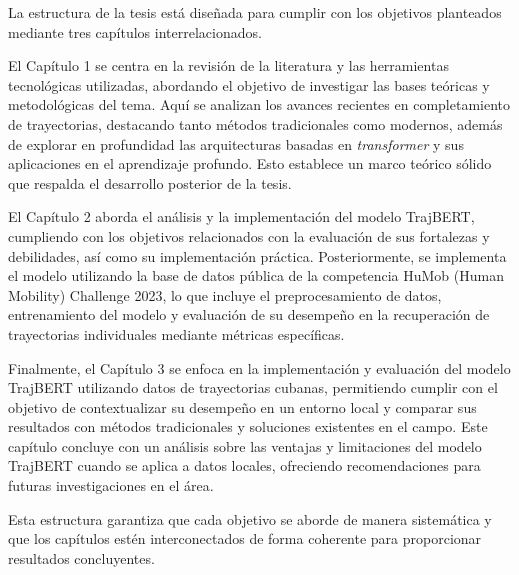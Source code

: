 
La estructura de la tesis está diseñada para cumplir con los objetivos planteados mediante tres capítulos interrelacionados.

El Capítulo 1 se centra en la revisión de la literatura y las herramientas tecnológicas utilizadas, abordando el objetivo de investigar las bases teóricas y metodológicas del tema. Aquí se analizan los avances recientes en completamiento de trayectorias, destacando tanto métodos tradicionales como modernos, además de explorar en profundidad las arquitecturas basadas en \textit{transformer} y sus aplicaciones en el aprendizaje profundo. Esto establece un marco teórico sólido que respalda el desarrollo posterior de la tesis.

El Capítulo 2 aborda el análisis y la implementación del modelo TrajBERT, cumpliendo con los objetivos relacionados con la evaluación de sus fortalezas y debilidades, así como su implementación práctica. Posteriormente, se implementa el modelo utilizando la base de datos pública de la competencia HuMob (Human Mobility) Challenge 2023, lo que incluye el preprocesamiento de datos, entrenamiento del modelo y evaluación de su desempeño en la recuperación de trayectorias individuales mediante métricas específicas.

Finalmente, el Capítulo 3 se enfoca en la implementación y evaluación del modelo TrajBERT utilizando datos de trayectorias cubanas, permitiendo cumplir con el objetivo de contextualizar su desempeño en un entorno local y comparar sus resultados con métodos tradicionales y soluciones existentes en el campo. Este capítulo concluye con un análisis sobre las ventajas y limitaciones del modelo TrajBERT cuando se aplica a datos locales, ofreciendo recomendaciones para futuras investigaciones en el área.

Esta estructura garantiza que cada objetivo se aborde de manera sistemática y que los capítulos estén interconectados de forma coherente para proporcionar resultados concluyentes.